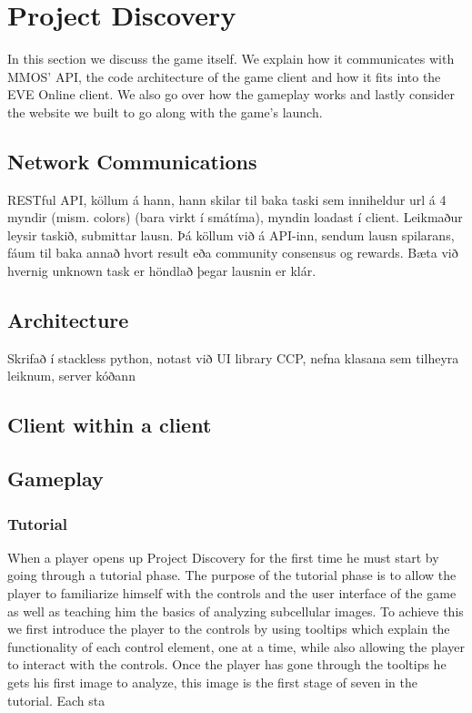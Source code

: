 \section{Project Discovery}\label{sec:projectdiscovery}

	In this section we discuss the game itself. We explain how it communicates with MMOS' API, the code architecture of the game client and how it fits into the EVE Online client. We also go over how the gameplay works and lastly consider the website we built to go along with the game's launch.

\subsection{Network Communications}

	RESTful API, köllum á hann, hann skilar til baka taski sem inniheldur url á 4 myndir (mism. colors) (bara virkt í smátíma), myndin loadast í client. Leikmaður leysir taskið, submittar lausn. Þá köllum við á API-inn, sendum lausn spilarans, fáum til baka annað hvort result eða community consensus og rewards. Bæta við hvernig unknown task er höndlað þegar lausnin er klár.

\subsection{Architecture}

	Skrifað í stackless python, notast við UI library CCP, nefna klasana sem tilheyra leiknum, server kóðann

\subsection{Client within a client}

\subsection{Gameplay}

	\subsubsection{Tutorial}
		When a player opens up Project Discovery for the first time he must start by going through a tutorial phase. The purpose of the tutorial phase is to allow the player to familiarize himself with the controls and the user interface of the game as well as teaching him the basics of analyzing subcellular images. To achieve this we first introduce the player to the controls by using tooltips which explain the functionality of each control element, one at a time, while also allowing the player to interact with the controls. Once the player has gone through the tooltips he gets his first image to analyze, this image is the first stage of seven in the tutorial. Each sta


